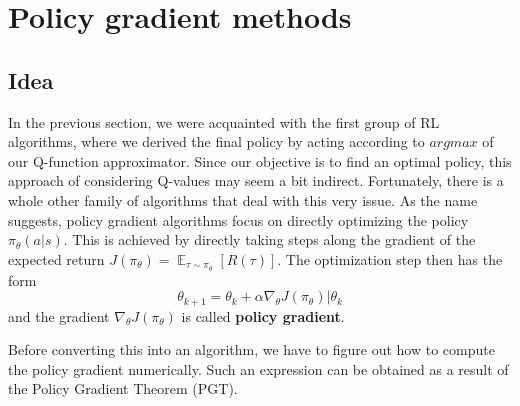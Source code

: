 \section{Policy gradient methods}
\subsection{Idea}
In the previous section, we were acquainted with the first group of RL algorithms, where we derived the final policy by acting according to $argmax$ of our Q-function approximator.
Since our objective is to find an optimal policy, this approach of considering Q-values may seem a bit indirect.
Fortunately, there is a whole other family of algorithms that deal with this very issue.
As the name suggests, policy gradient algorithms focus on directly optimizing the policy $\pi_\theta(a|s)$. 
This is achieved by directly taking steps along the gradient of the expected return $J(\pi_\theta) = \mathop{\mathbb{E}}_{\tau \sim \pi_\theta}[R(\tau)]$.
The optimization step then has the form
\[\theta_{k+1} = \theta_k+\alpha  \nabla_\theta J(\pi_\theta)|\theta_k\] and the gradient $\nabla_\theta J(\pi_\theta)$ is called \textbf{policy gradient}.

Before converting this into an algorithm, we have to figure out how to compute the policy gradient numerically.
Such an expression can be obtained as a result of the Policy Gradient Theorem (PGT).

\par
